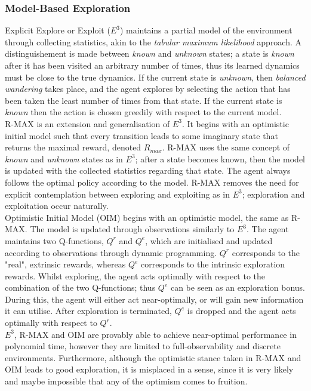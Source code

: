 \subsubsection{Model-Based Exploration}
Explicit Explore or Exploit ($E^3$) \cite{Kearns+Singh:2002} maintains a partial model of the environment through collecting statistics, akin to the \textit{tabular maximum likelihood} approach. A distinguishement is made between \textit{known} and \textit{unknown} states; a state is \textit{known} after it has been visited an arbitrary number of times, thus its learned dynamics must be close to the true dynamics. If the current state is \textit{unknown}, then \textit{balanced wandering} takes place, and the agent explores by selecting the action that has been taken the least number of times from that state. If the current state is \textit{known} then the action is chosen greedily with respect to the current model.
\\ R-MAX \cite{10.1162/153244303765208377} is an extension and generalisation of $E^3$. It begins with an optimistic initial model such that every transition leads to some imaginary state that returns the maximal reward, denoted $R_{max}$. R-MAX uses the same concept of \textit{known} and \textit{unknown} states as in $E^3$; after a state becomes known, then the model is updated with the collected statistics regarding that state. The agent always follows the optimal policy according to the model. R-MAX removes the need for explicit contemplation between exploring and exploiting as in $E^3$; exploration and exploitation occur naturally.
\\ Optimistic Initial Model (OIM) \cite{10.1145/1390156.1390288} begins with an optimistic model, the same as R-MAX. The model is updated through observations similarly to $E^3$. The agent maintains two Q-functions, $Q^r$ and $Q^e$, which are initialised and updated according to observations through dynamic programming. $Q^r$ corresponds to the "real", extrinsic rewards, whereas $Q^e$ corresponds to the intrinsic exploration rewards. Whilst exploring, the agent acts optimally with respect to the combination of the two Q-functions; thus $Q^e$ can be seen as an exploration bonus. During this, the agent will either act near-optimally, or will gain new information it can utilise. After exploration is terminated, $Q^e$ is dropped and the agent acts optimally with respect to $Q^r$.
\\ $E^3$, R-MAX and OIM are provably able to achieve near-optimal performance in polynomial time, however they are limited to full-observability and discrete environments. Furthermore, although the optimistic stance taken in R-MAX and OIM leads to good exploration, it is misplaced in a sense, since it is very likely and maybe impossible that any of the optimism comes to fruition.
